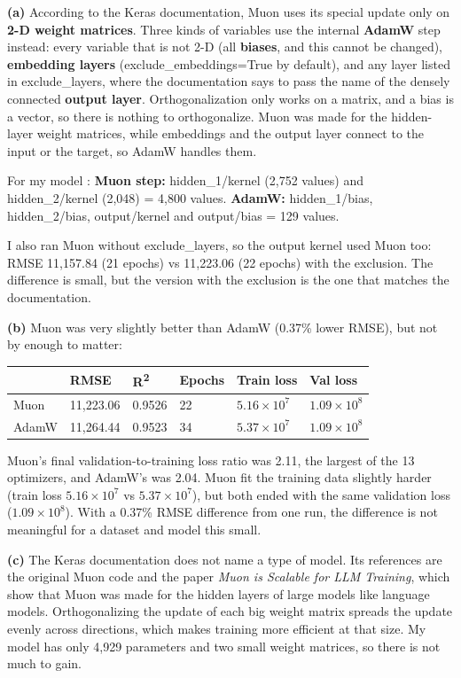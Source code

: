 \documentclass[12pt,a4paper]{article}
\begin{document}
\begin{answerbox}
\textbf{(a)} According to the Keras documentation, Muon uses its special update only on \textbf{2-D weight matrices}. Three kinds of variables use the internal \textbf{AdamW} step instead: every variable that is not 2-D (all \textbf{biases}, and this cannot be changed), \textbf{embedding layers} (exclude\_embeddings=True by default), and any layer listed in exclude\_layers, where the documentation says to pass the name of the densely connected \textbf{output layer}. Orthogonalization only works on a matrix, and a bias is a vector, so there is nothing to orthogonalize. Muon was made for the hidden-layer weight matrices, while embeddings and the output layer connect to the input or the target, so AdamW handles them.

For my model : \textbf{Muon step:} hidden\_1/kernel (2,752 values) and hidden\_2/kernel (2,048) = 4,800 values. \textbf{AdamW:} hidden\_1/bias, hidden\_2/bias, output/kernel and output/bias = 129 values.

I also ran Muon without exclude\_layers, so the output kernel used Muon too: RMSE 11,157.84 (21 epochs) vs 11,223.06 (22 epochs) with the exclusion. The difference is small, but the version with the exclusion is the one that matches the documentation.

\textbf{(b)} Muon was very slightly better than AdamW (0.37\% lower RMSE), but not by enough to matter:

\begin{center}\small
\begin{tabular}{@{}llllll@{}}
\toprule
& RMSE & R\textsuperscript{2} & Epochs & Train loss & Val loss \\
\midrule
Muon & 11,223.06 & 0.9526 & 22 & \(5.16\times10^7\) & \(1.09\times10^8\) \\
AdamW & 11,264.44 & 0.9523 & 34 & \(5.37\times10^7\) & \(1.09\times10^8\) \\
\bottomrule
\end{tabular}
\end{center}

Muon's final validation-to-training loss ratio was 2.11, the largest of the 13 optimizers, and AdamW's was 2.04. Muon fit the training data slightly harder (train loss \(5.16\times10^7\) vs \(5.37\times10^7\)), but both ended with the same validation loss (\(1.09\times10^8\)). With a 0.37\% RMSE difference from one run, the difference is not meaningful for a dataset and model this small.

\textbf{(c)} The Keras documentation does not name a type of model. Its references are the original Muon code and the paper \emph{Muon is Scalable for LLM Training}, which show that Muon was made for the hidden layers of large models like language models. Orthogonalizing the update of each big weight matrix spreads the update evenly across directions, which makes training more efficient at that size. My model has only 4,929 parameters and two small weight matrices, so there is not much to gain.


\end{answerbox}
\end{document}
